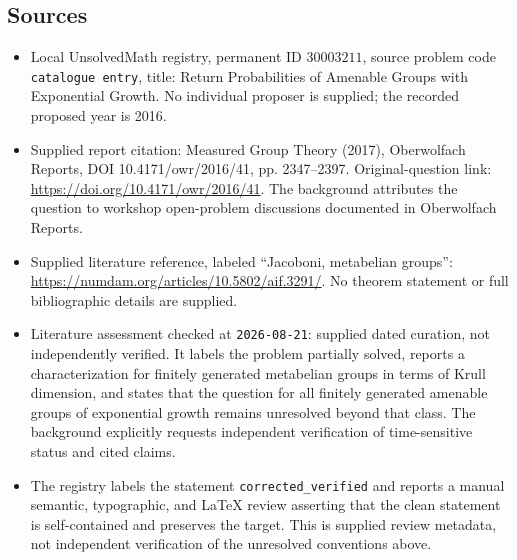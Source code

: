 \documentclass[11pt]{article}
\begin{document}
\subsection{Sources}
\begin{itemize}
\item Local UnsolvedMath registry, permanent ID \(30003211\), source problem code \texttt{catalogue entry}, title: Return Probabilities of Amenable Groups with Exponential Growth. No individual proposer is supplied; the recorded proposed year is 2016.
\item Supplied report citation: Measured Group Theory (2017), Oberwolfach Reports, DOI 10.4171/owr/2016/41, pp. 2347--2397. Original-question link: \url{https://doi.org/10.4171/owr/2016/41}. The background attributes the question to workshop open-problem discussions documented in Oberwolfach Reports.
\item Supplied literature reference, labeled ``Jacoboni, metabelian groups'': \url{https://numdam.org/articles/10.5802/aif.3291/}. No theorem statement or full bibliographic details are supplied.
\item Literature assessment checked at \texttt{2026-08-21}: supplied dated curation, not independently verified. It labels the problem partially solved, reports a characterization for finitely generated metabelian groups in terms of Krull dimension, and states that the question for all finitely generated amenable groups of exponential growth remains unresolved beyond that class. The background explicitly requests independent verification of time-sensitive status and cited claims.
\item The registry labels the statement \texttt{corrected\_verified} and reports a manual semantic, typographic, and LaTeX review asserting that the clean statement is self-contained and preserves the target. This is supplied review metadata, not independent verification of the unresolved conventions above.
\end{itemize}
\end{document}
